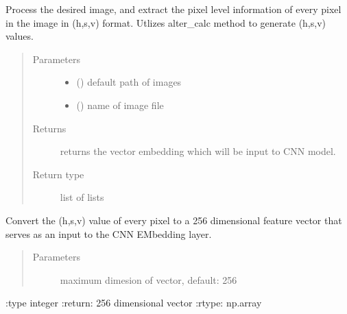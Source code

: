 \documentclass[letterpaper,10pt,english]{sphinxmanual}
\begin{document}
\begin{fulllineitems}
\label{\detokenize{basefunctions:basefunctions.image_area_calculator}}
Process the desired image, and extract the pixel level information of every pixel in the image in (h,s,v) format.
Utlizes alter\_calc method to generate (h,s,v) values.
\begin{quote}\begin{description}
\item[{Parameters}] \leavevmode\begin{itemize}
\item {} 
 () \textendash{} default path of images

\item {} 
 () \textendash{} name of image file

\end{itemize}

\item[{Returns}] \leavevmode
returns the vector embedding which will be input to CNN model.

\item[{Return type}] \leavevmode
list of lists

\end{description}\end{quote}

\end{fulllineitems}


\begin{fulllineitems}
\label{\detokenize{basefunctions:basefunctions.kerasTokenizerUnit}}
Convert the (h,s,v) value of every pixel to a 256 dimensional feature vector that serves as an input to the CNN EMbedding layer.
\begin{quote}\begin{description}
\item[{Parameters}] \leavevmode
{} \textendash{} maximum dimesion of vector, default: 256

\end{description}\end{quote}

:type integer
:return: 256 dimensional vector
:rtype: np.array

\end{fulllineitems}
\end{document}
